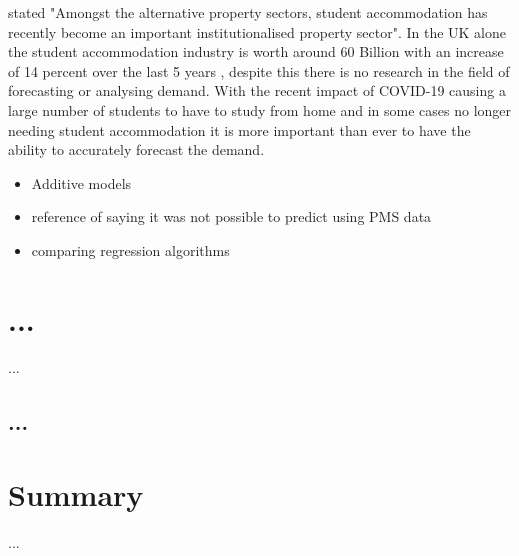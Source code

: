 \vspace{5mm}

\cite{Newell2018TheSector} stated "Amongst the alternative property sectors, student accommodation has recently become an important institutionalised property sector". In the UK alone the student accommodation industry is worth around 60 Billion \cite{UKWakefield} with an increase of 14 percent over the last 5 years \cite{UKWakefield}, despite this there is no research in the field of forecasting or analysing demand. With the recent impact of COVID-19 causing a large number of students to have to study from home and in some cases no longer needing student accommodation it is more important than ever to have the ability to accurately forecast the demand. 



\vspace{5mm}

\begin{itemize}
\item Additive models

\item reference of saying it was not possible to predict using PMS data
\item comparing regression algorithms
\end{itemize}





\section{...}
...


\subsection{...}


\section{Summary}
...


